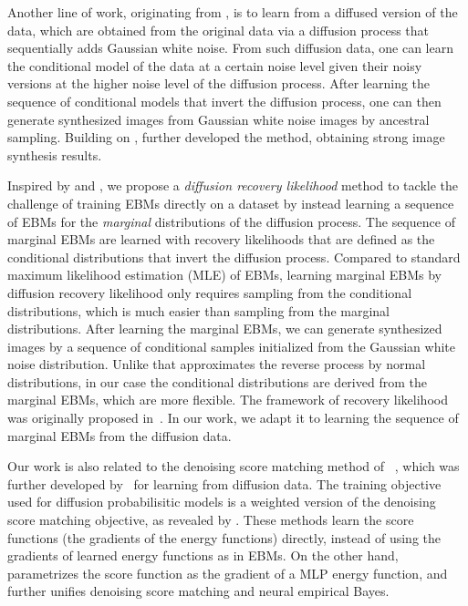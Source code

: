 \documentclass{article} \usepackage{iclr2021_conference,times}
\begin{document}
Another line of work, originating from \citet{sohl2015deep}, is to learn from a diffused version of the data, which are obtained from the original data via a diffusion process that sequentially adds Gaussian white noise. From such diffusion data, one can learn the conditional model of the data at a certain noise level given their noisy versions at the higher noise level of the diffusion process. After learning the sequence of conditional models that invert the diffusion process, one can then generate synthesized images from Gaussian white noise images by ancestral sampling.  Building on \citet{sohl2015deep}, \citet{ho2020denoising} further developed the method, obtaining strong image synthesis results. 

Inspired by \citet{sohl2015deep} and \citet{ho2020denoising}, we propose a {\em diffusion recovery likelihood} method to tackle the challenge of training EBMs directly on a dataset by instead learning a sequence of EBMs for the {\em marginal} distributions of the diffusion process. The sequence of marginal EBMs are learned with recovery likelihoods that are defined as the conditional distributions that invert the diffusion process. Compared to  standard maximum likelihood estimation (MLE) of EBMs, learning marginal EBMs by diffusion recovery likelihood only requires sampling from the conditional distributions, which is much easier than sampling from the marginal distributions. After learning the marginal EBMs, we can generate synthesized images by a sequence of conditional samples initialized from the Gaussian white noise distribution. Unlike \citet{ho2020denoising} that approximates the reverse process by normal distributions, in our case the conditional distributions are derived from the marginal EBMs, which are more flexible. The framework of recovery likelihood was originally proposed in~\citet{bengio2013generalized}. In our work, we adapt it to learning the sequence of marginal EBMs from the diffusion data. 







Our work is also related to the denoising score matching method of ~\citet{vincent2011connection}, which was further developed by~\citet{song2019generative,song2020improved} for learning from diffusion data. The training objective used for diffusion probabilisitic models is a weighted version of the denoising score matching objective, as revealed by \citet{ho2020denoising}. These methods learn the score functions (the gradients of the energy functions) directly, instead of using the gradients of learned energy functions as in EBMs. On the other hand, \cite{saremi2018deep} parametrizes the score function as the gradient of a MLP energy function, and \cite{saremi2019neural} further unifies denoising score matching and neural empirical Bayes.  
\end{document}
